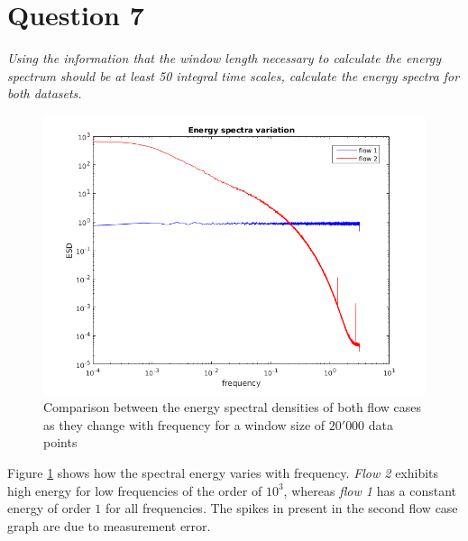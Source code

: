 \section*{Question 7}
\textit{Using the information that the window length necessary to calculate the energy spectrum should be at least 50 integral time scales, calculate the energy spectra for both datasets.}

\begin{figure}[!ht]
\centering
\includegraphics[scale=0.7]{./TEXT/esd.png}
\caption{Comparison between the energy spectral densities of both flow cases as they change with frequency for a window size of $20'000$ data points}
\label{esd}
\end{figure}

Figure \ref{esd} shows how the spectral energy varies with frequency. \emph{Flow 2} exhibits high energy for low frequencies of the order of $10^{3}$, whereas \emph{flow 1} has a constant energy of order $1$ for all frequencies. The spikes in present in the second flow case graph are due to measurement error.